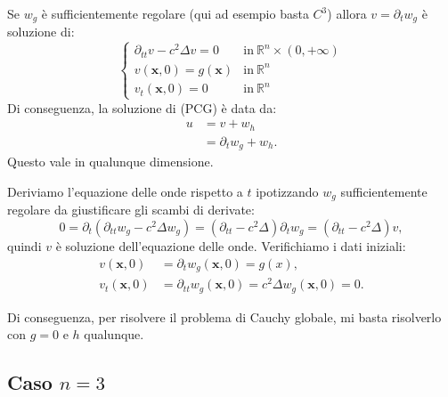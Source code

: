 \documentclass[10pt,a4paper,twoside,openright]{book}
\newcommand{\x}{\mathbf{x}}
\begin{document}
\begin{theorem}
	[Lemma A] Se $\displaystyle w_{g}$ è sufficientemente regolare (qui ad esempio basta $\displaystyle C^{3}$) allora $\displaystyle v=\partial _{t} w_{g}$ è soluzione di:
	\begin{equation*}
		\begin{cases}
			\partial _{tt} v-c^{2} \Delta v=0 & \text{in} \ \mathbb{R}^{n} \times ( 0,+\infty ) \\
			v(\x ,0) =g(\x)   & \text{in} \ \mathbb{R}^{n}                      \\
			v_{t}(\x ,0) =0           & \text{in} \ \mathbb{R}^{n}                      
		\end{cases}
	\end{equation*}
	Di conseguenza, la soluzione di (PCG) è data da:
	\begin{align*}
		u & =v+w_{h}                      \\
		  & =\partial _{t} w_{g} +w_{h} . 
	\end{align*}
	Questo vale in qualunque dimensione.
	\label{thm:lemma-A}
\end{theorem}
\begin{dimostrazione}
	Deriviamo l'equazione delle onde rispetto a $\displaystyle t$ ipotizzando $\displaystyle w_{g}$ sufficientemente regolare da giustificare gli scambi di derivate:
	\begin{equation*}
		0=\partial _{t}\left( \partial _{tt} w_{g} -c^{2} \Delta w_{g}\right) =\left( \partial _{tt} -c^{2} \Delta \right) \partial _{t} w_{g} =\left( \partial _{tt} -c^{2} \Delta \right) v,
	\end{equation*}
	quindi $\displaystyle v$ è soluzione dell'equazione delle onde. Verifichiamo i dati iniziali:
	\begin{align*}
		v(\x ,0)     & =\partial _{t} w_{g}(\x ,0) =g( x) ,                                \\
		v_{t}(\x ,0) & =\partial _{tt} w_{g}(\x ,0) =c^{2} \Delta w_{g}(\x ,0) =0. 
	\end{align*}
\end{dimostrazione}
Di conseguenza, per risolvere il problema di Cauchy globale, mi basta risolverlo con $\displaystyle g=0$ e $\displaystyle h$ qualunque.
\subsection{Caso \texorpdfstring{$n=3$}{n=3}}
\end{document}
